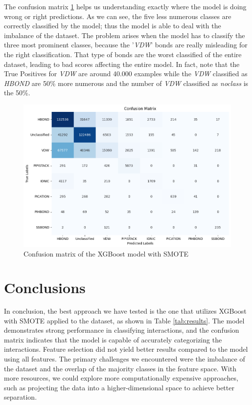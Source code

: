 \documentclass[10pt,twocolumn,letterpaper]{article}
\begin{document}
The confusion matrix \ref{fig:cmXGBoostSMOTE} helps us understanding exactly where the model is doing wrong or right 
predictions. As we can see, the five less numerous classes are correctly classified by the model; thus the model is able 
to deal with the imbalance of the dataset. The problem arises when the model has to classify the three most prominent 
classes, because the '\textit{VDW}' bonds are really misleading for the right classification. 
That type of bonds are the worst classified of the entire dataset, leading to bad scores affecting the entire model. 
In fact, note that the True Positives for \textit{VDW} are around 40.000 examples while the \textit{VDW} classified as \textit{HBOND} are 50\% more numerous and the number of \textit{VDW} classified as \textit{noclass} is the 50\%.
\begin{center}
    \begin{figure}[h!]
        \centering
        \includegraphics[scale=0.35]{img/cmXGBoostSMOTE.png}
        \caption{Confusion matrix of the XGBoost model with SMOTE}
        \label{fig:cmXGBoostSMOTE}
    \end{figure}
\end{center}

\section{Conclusions}
In conclusion, the best approach we have tested is the one that utilizes XGBoost with SMOTE applied to the dataset, as shown in Table \ref{tab:results}. 
The model demonstrates strong performance in classifying interactions, and the confusion matrix indicates that the model is capable of accurately categorizing the interactions. 
Feature selection did not yield better results compared to the model using all features. 
The primary challenges we encountered were the imbalance of the dataset and the overlap of the majority classes in the feature space. 
With more resources, we could explore more computationally expensive approaches, such as projecting the data into a higher-dimensional space to achieve better separation.


{\small


}
\end{document}
